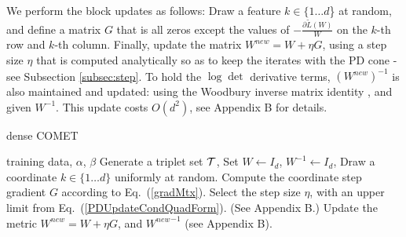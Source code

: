 \documentclass[twoside,11pt]{article}
\newcommand\mat[1]{{#1}}
\newcommand{\T}{{}^\mathsf{T}}
\newcommand{\W}{\mat{W}}
\newcommand{\newW}{{\mat{W^{new}}}}
\newcommand{\tL}{\tilde{L}(\W)}
\newcommand{\cholL}{\mat{L}}
\newcommand{\grd}{\frac{\partial \tL}{\W}}
\renewcommand{\eqref}[1]{Eq.~(\ref{#1})}
\begin{document}
We perform the block updates as follows: %
Draw a feature $k \in \{1 \ldots d$\} at random, and define a matrix $\mat{G}$ that is all zeros except the values of $-\grd$ on the $k$-th row and $k$-th column. Finally, update the matrix $\newW = \W +\eta \mat{G}$, using a step size $\eta$ that is computed analytically so as to keep the iterates with the PD cone -  see Subsection \ref{subsec:step}.
To hold the $\log\det$ derivative terms, $(\newW)^{-1}$ is also maintained and updated: using the Woodbury inverse matrix identity \citep{woodbury1950inverting}, and given $\W^{-1}$. This update costs $O(d^2)$, see Appendix B for details.

\begin{algorithm}[th]
   \caption{dense COMET}
   \label{alg:comet}
\begin{algorithmic}[1]
    training data, $\alpha$, $\beta$
   \STATE Generate a triplet set $\cal{T}$, Set  $\W  \leftarrow I_d$, $\W^{-1}  \leftarrow I_d$, %
   \REPEAT 
   \STATE Draw a coordinate $k \in \{1 \ldots d\}$ uniformly at random.
   \STATE Compute the coordinate step gradient $\mat{G}$ according to \eqref{gradMtx}.
   \STATE Select the step size $\eta$, with an upper limit from \eqref{PDUpdateCondQuadForm}. (See Appendix B.)
   \STATE Update the metric $\newW=\W+\eta G$, and $\newW^{-1}$ (see Appendix B).
\end{algorithmic}
\vskip -5pt
\end{algorithm}

\vspace{-6pt}
\end{document}
